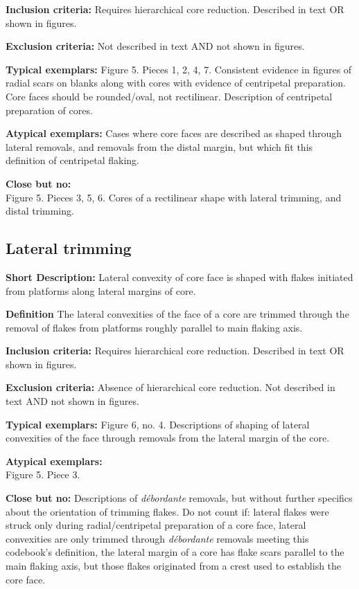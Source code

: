 \documentclass[
]{article}
\begin{document}
\textbf{Inclusion criteria:} Requires hierarchical core reduction.
Described in text OR shown in figures.

\textbf{Exclusion criteria:} Not described in text AND not shown in
figures.

\textbf{Typical exemplars:} Figure 5. Pieces 1, 2, 4, 7. Consistent
evidence in figures of radial scars on blanks along with cores with
evidence of centripetal preparation. Core faces should be rounded/oval,
not rectilinear. Description of centripetal preparation of cores.

\textbf{Atypical exemplars:} Cases where core faces are described as
shaped through lateral removals, and removals from the distal margin,
but which fit this definition of centripetal flaking.

\textbf{Close but no:}\\
Figure 5. Pieces 3, 5, 6. Cores of a rectilinear shape with lateral
trimming, and distal trimming.

\subsection{Lateral trimming}\label{lateral-trimming}

\textbf{Short Description:} Lateral convexity of core face is shaped
with flakes initiated from platforms along lateral margins of core.

\textbf{Definition} The lateral convexities of the face of a core are
trimmed through the removal of flakes from platforms roughly parallel to
main flaking axis.

\textbf{Inclusion criteria:} Requires hierarchical core reduction.
Described in text OR shown in figures.

\textbf{Exclusion criteria:} Absence of hierarchical core reduction. Not
described in text AND not shown in figures.

\textbf{Typical exemplars:} Figure 6, no. 4. Descriptions of shaping of
lateral convexities of the face through removals from the lateral margin
of the core.

\textbf{Atypical exemplars:}\\
Figure 5. Piece 3.

\textbf{Close but no:} Descriptions of \emph{débordante} removals, but
without further specifics about the orientation of trimming flakes. Do
not count if: lateral flakes were struck only during radial/centripetal
preparation of a core face, lateral convexities are only trimmed through
\emph{débordante} removals meeting this codebook's definition, the
lateral margin of a core has flake scars parallel to the main flaking
axis, but those flakes originated from a crest used to establish the
core face.
\end{document}
